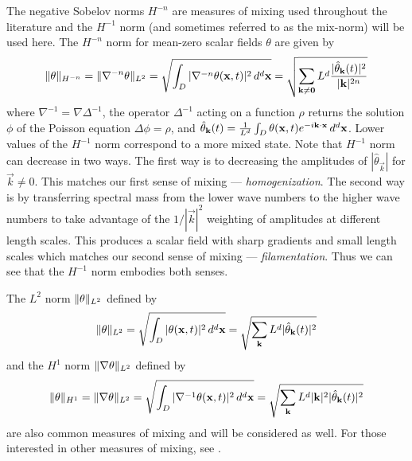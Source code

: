 The negative Sobelov norms $H^{-n}$ \cite{GM2005, Mathew2007b,JLT2012, JFM2011} are measures of mixing used throughout the literature and the $H^{-1}$ norm (and sometimes referred to as the mix-norm) will be used here. The $H^{-n}$ norm for mean-zero scalar fields $\theta$ are given by  
%
\begin{equation}
\|\theta\|_{H^{-n}}=\|\nabla^{-n}\theta\|_{L^{2}}=\sqrt{\int_{D}  |\nabla^{-n} \theta( \mathbf{x},t)|^2 \, d^{d}\mathbf{x}}=\sqrt{ \sum_{\mathbf{k}\neq \mathbf{0}} L^d \frac{|\hat{\theta}_{\mathbf{k}}(t)|^{2}}{|\mathbf{k}|^{2n}}}
\end{equation}
%
where $\nabla^{-1}=\nabla \Delta^{-1}$, the operator $\Delta^{-1}$ acting on  a function $\rho$ returns the solution $\phi$ of the Poisson equation $ \Delta \phi = \rho $, and $\hat{\theta}_{\mathbf{k}}(t) =  \frac{1}{L^{d}}\int_{D} \theta(\mathbf{x},t)e^{-i\mathbf{k}\cdot\mathbf{x}} \, d^{d}\mathbf{x}$.  Lower values of the  $H^{-1}$ norm correspond to a more mixed state. Note that $H^{-1}$ norm can decrease in two ways. The first way is to decreasing the amplitudes of $|\hat{\theta}_{\vec{k}}|$ for $\vec{k}\neq 0$. This matches our first sense of mixing --- {\it homogenization}. The second way is by transferring spectral mass from the lower wave numbers to the higher wave numbers to take advantage of the $1/|\vec{k}|^2$ weighting of amplitudes at different length scales. This produces a scalar field with sharp gradients and small length scales which matches our second sense of mixing --- {\it filamentation}. Thus we can see that the $H^{-1}$ norm embodies both senses. 

The $L^{2}$ norm $\|\theta\|_{L^{2}}$ defined by
%
\begin{equation}
\|\theta\|_{L^{2}}=\sqrt{\int_{D}  | \theta( \mathbf{x},t)|^2 \, d^{d}\mathbf{x}}=\sqrt{ \sum_{\mathbf{k}} L^d |\hat{\theta}_{\mathbf{k}}(t)|^{2}}
\end{equation}
%
and the $H^{1}$ norm $\| \nabla \theta\|_{L^{2}}$ defined by 
%
\begin{equation}
\|\theta\|_{H^{1}} = \| \nabla \theta\|_{L^{2}}=\sqrt{\int_{D}  |\nabla^{-1} \theta( \mathbf{x},t)|^2 \, d^{d}\mathbf{x}}=\sqrt{ \sum_{\mathbf{k}} L^d |\mathbf{k}|^2|\hat{\theta}_{\mathbf{k}}(t)|^{2}}
\end{equation}
%
are also common measures of mixing and will be considered as well.  For those interested in other measures of mixing, see \cite{JLT2012}. 

			
